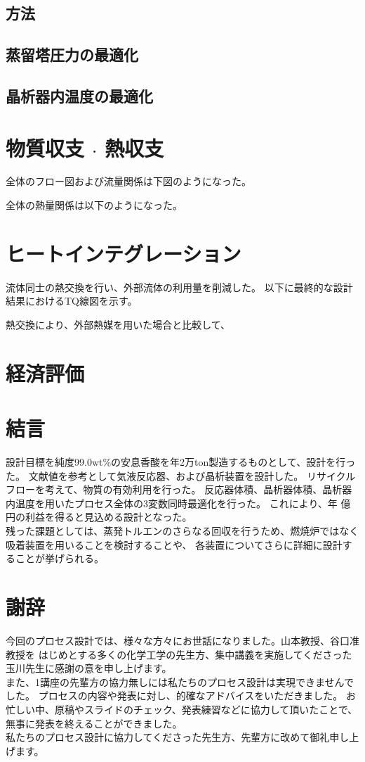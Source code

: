 \documentclass[a4j]{jsreport}
\begin{document}
\section{方法}

\section{蒸留塔圧力の最適化}

\section{晶析器内温度の最適化}

\newpage
\chapter{物質収支 $\cdot$ 熱収支}
全体のフロー図および流量関係は下図のようになった。

全体の熱量関係は以下のようになった。

\newpage
\chapter{ヒートインテグレーション}
流体同士の熱交換を行い、外部流体の利用量を削減した。
以下に最終的な設計結果におけるTQ線図を示す。

熱交換により、外部熱媒を用いた場合と比較して、

\newpage
\chapter{経済評価}

\newpage
\chapter{結言}
設計目標を純度99.0wt\%の安息香酸を年2万ton製造するものとして、設計を行った。
文献値を参考として気液反応器、および晶析装置を設計した。
リサイクルフローを考えて、物質の有効利用を行った。
反応器体積、晶析器体積、晶析器内温度を用いたプロセス全体の3変数同時最適化を行った。
これにより、年 億円の利益を得ると見込める設計となった。\\
残った課題としては、蒸発トルエンのさらなる回収を行うため、燃焼炉ではなく吸着装置を用いることを検討することや、
各装置についてさらに詳細に設計することが挙げられる。

\newpage
\chapter*{謝辞}
今回のプロセス設計では、様々な方々にお世話になりました。山本教授、谷口准教授を
はじめとする多くの化学工学の先生方、集中講義を実施してくださった玉川先生に感謝の意を申し上げます。\\
また、1講座の先輩方の協力無しには私たちのプロセス設計は実現できませんでした。
プロセスの内容や発表に対し、的確なアドバイスをいただきました。
お忙しい中、原稿やスライドのチェック、発表練習などに協力して頂いたことで、無事に発表を終えることができました。\\
私たちのプロセス設計に協力してくださった先生方、先輩方に改めて御礼申し上げます。
\end{document}
